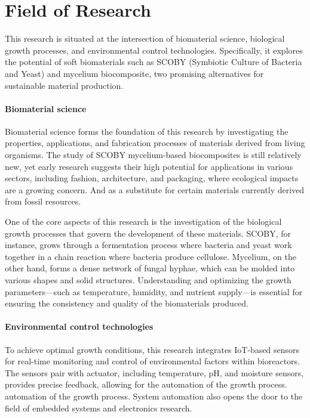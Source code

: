 \section{Field of Research}

This research is situated at the intersection of biomaterial science, biological growth processes, and environmental control technologies. Specifically, 
it explores the potential of soft biomaterials such as SCOBY (Symbiotic Culture of Bacteria and Yeast) and mycelium biocomposite, two promising alternatives 
for sustainable material production. 

\paragraph[short]{Biomaterial science} 
Biomaterial science forms the foundation of this research by investigating the properties, applications, and fabrication processes of materials derived from living organisms. 
The study of SCOBY mycelium-based biocomposites is still relatively new, yet early research suggests their high potential for applications in various sectors, including fashion\cite{amobonye2023fungal}, architecture\cite{ghazvinian2019mycelium}, and packaging\cite{abhijith2018sustainable}, where ecological impacts are a growing concern. And as a substitute for certain materials currently derived from fossil resources\cite{jang2017bacterial}.

One of the core aspects of this research is the investigation of the biological growth processes that govern the development of these materials. SCOBY, for instance, grows through a fermentation process where bacteria and yeast work together in a chain reaction where bacteria produce cellulose. Mycelium, on the other hand, forms a dense network of fungal hyphae, which can be molded into various shapes and solid structures. Understanding and optimizing the growth parameters—such as temperature, humidity, and nutrient supply—is essential for ensuring the consistency and quality of the biomaterials produced.

\paragraph[short]{Environmental
control technologies}
To achieve optimal growth conditions, this research integrates IoT-based sensors for real-time monitoring and control of environmental factors within bioreactors. 
The sensors pair with actuator, including temperature, pH, and moisture sensors, provides precise feedback, allowing for the automation of the growth process. 
automation of the growth process. System automation also opens the door to the field of embedded systems and electronics research. 

